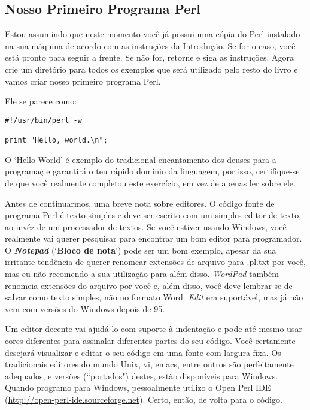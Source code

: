 \documentclass[a4paper,12pt,twoside]{book}
\begin{document}
\subsection{Nosso Primeiro Programa Perl}

\noindent Estou assumindo que neste momento você já possui uma cópia do Perl 
instalado na sua máquina de acordo com as instru\c{c}ões da Introdu\c{c}ão. 
Se for o caso, você está pronto para seguir a frente. Se não for, retorne e 
siga as instru\c{c}ões. Agora crie um diretório para todos os exemplos que 
será utilizado pelo resto do livro e vamos criar nosso primeiro programa Perl.\medskip

\noindent Ele se parece como:
\begin{lstlisting}
#!/usr/bin/perl -w

print "Hello, world.\n";
\end{lstlisting}

\noindent O `Hello World' é exemplo do tradicional encantamento dos deuses para a 
programa\c{c} e garantirá o teu rápido domínio da linguagem, por isso, 
certifique-se de que você realmente completou este exercício, em vez de 
apenas ler sobre ele.\medskip

\noindent Antes de continuarmos, uma breve nota sobre editores. O código 
fonte de programa Perl é texto simples e deve ser escrito com um simples 
editor de texto, ao invéz de um processador de textos. Se você estiver usando 
Windows, você realmente vai querer pesquisar para encontrar um bom editor para 
programador. O \textit{\textbf{Notepad}} (`\textbf{Bloco de nota}') pode ser 
um bom exemplo, apesar da sua irritante tendência de querer renomear extensões 
de arquivo para .pl.txt por você, mas eu não recomendo a sua utilização para 
além disso. \textit{WordPad} também renomeia extensões do arquivo por você e, 
além disso, você deve lembrar-se de salvar como texto simples, não no formato Word. 
\textit{Edit} era suportável, mas já não vem com versões do Windows depois de 95.\medskip

\noindent Um editor decente vai ajudá-lo com suporte à indentação e pode até 
mesmo usar cores diferentes para assinalar diferentes partes do seu código. 
Você certamente desejará visualizar e editar o seu código em uma fonte com 
largura fixa. Os tradicionais editores do mundo Unix, vi, emacs, entre outros 
são perfeitamente adequados, e versões (``portados") destes, estão disponíveis 
para Windows. Quando programo para Windows, pessoalmente utilizo o Open Perl 
IDE (\url{http://open-perl-ide.sourceforge.net}). Certo, então, de volta para o código.\medskip
\end{document}
